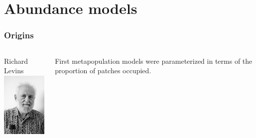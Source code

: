 \documentclass[color=usenames,dvipsnames]{beamer}\usepackage[]{graphicx}\usepackage[]{xcolor}
\begin{document}
\section{Abundance models}



\begin{frame}
  \frametitle{Origins}
  \begin{columns}
    \begin{column}{0.3\textwidth}
      Richard Levins \\
      \includegraphics[width=\textwidth]{figs/levins}
    \end{column}
    \begin{column}{0.7\textwidth}
      {First metapopulation models were parameterized in terms of the
        \alert{proportion of patches occupied}. \par}

\end{column}
\end{columns}
\end{frame}
\end{document}

